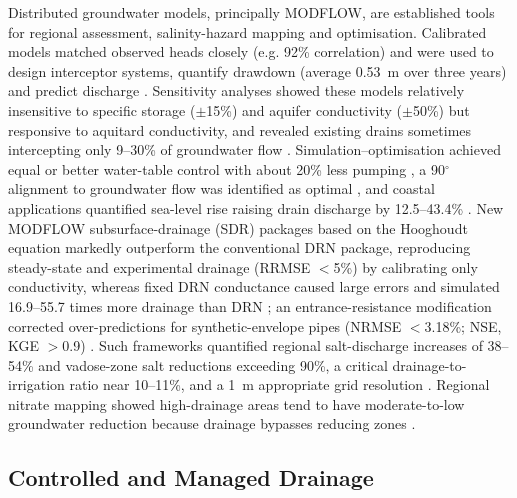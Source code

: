 Distributed groundwater models, principally MODFLOW, are established tools for regional assessment, salinity-hazard mapping and optimisation. Calibrated models matched observed heads closely (e.g. 92\% correlation) and were used to design interceptor systems, quantify drawdown (average 0.53~m over three years) and predict discharge \parencite{Ghorbani2016,Mirlas2012,Mirlas2009,Mirlas2013,Mirlas2021,AbdElaziz2025}. Sensitivity analyses showed these models relatively insensitive to specific storage ($\pm$15\%) and aquifer conductivity ($\pm$50\%) but responsive to aquitard conductivity, and revealed existing drains sometimes intercepting only 9--30\% of groundwater flow \parencite{Mirlas2012,Mirlas2009,Mirlas2013}. Simulation--optimisation achieved equal or better water-table control with about 20\% less pumping \parencite{Rana2008}, a 90$^{\circ}$ alignment to groundwater flow was identified as optimal \parencite{AbdElaziz2025}, and coastal applications quantified sea-level rise raising drain discharge by 12.5--43.4\% \parencite{AbdElaty2019}. New MODFLOW subsurface-drainage (SDR) packages based on the Hooghoudt equation markedly outperform the conventional DRN package, reproducing steady-state and experimental drainage (RRMSE $<$5\%) by calibrating only conductivity, whereas fixed DRN conductance caused large errors and simulated 16.9--55.7 times more drainage than DRN \parencite{Yang2022b,Han2025}; an entrance-resistance modification corrected over-predictions for synthetic-envelope pipes (NRMSE $<$3.18\%; NSE, KGE $>$0.9) \parencite{Qian2025b}. Such frameworks quantified regional salt-discharge increases of 38--54\% and vadose-zone salt reductions exceeding 90\%, a critical drainage-to-irrigation ratio near 10--11\%, and a 1~m appropriate grid resolution \parencite{Yang2022b,Han2025}. Regional nitrate mapping showed high-drainage areas tend to have moderate-to-low groundwater reduction because drainage bypasses reducing zones \parencite{Hojberg2017,Hansen2019}.

\subsection{Controlled and Managed Drainage}

